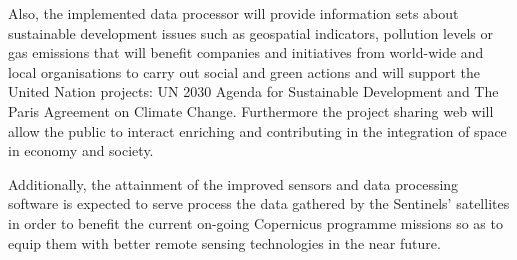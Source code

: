 Also, the implemented data processor will provide information sets about sustainable development issues such as geospatial indicators, pollution levels or gas emissions that will benefit companies and initiatives from world-wide and local organisations to carry out social and green actions and will support the United Nation projects: UN 2030 Agenda for Sustainable Development and The Paris Agreement on Climate Change. Furthermore the project sharing web will allow the public to interact enriching and contributing in the integration of space in economy and society.
 
Additionally, the attainment of the improved sensors and data processing software is expected to serve process the data gathered by the Sentinels' satellites in order to benefit the current on-going Copernicus programme missions so as to equip them with better remote sensing technologies in the near future.  








